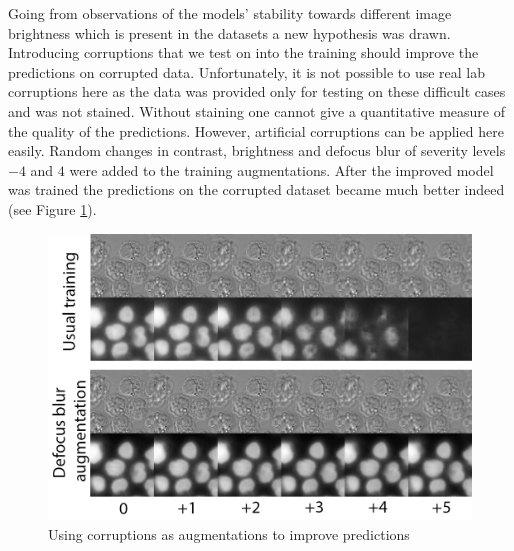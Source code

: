 Going from observations of the models' stability towards different image brightness which is present in the datasets a new hypothesis was drawn. Introducing corruptions that we test on into the training should improve the predictions on corrupted data. Unfortunately, it is not possible to use real lab corruptions here as the data was provided only for testing on these difficult cases and was not stained. Without staining one cannot give a quantitative measure of the quality of the predictions. However, artificial corruptions can be applied here easily. Random changes in contrast, brightness and defocus blur of severity levels $-4$ and $4$ were added to the training augmentations. After the improved model was trained the predictions on the corrupted dataset became much better indeed (see Figure \ref{fig:augments-help}).

\begin{figure}[htb]
	\begin{center}
		\includegraphics[width=0.4\linewidth]{bilder/stability/augments-help.png}
		\caption{Using corruptions as augmentations to improve predictions}\label{fig:augments-help}
	\end{center}
\end{figure}

